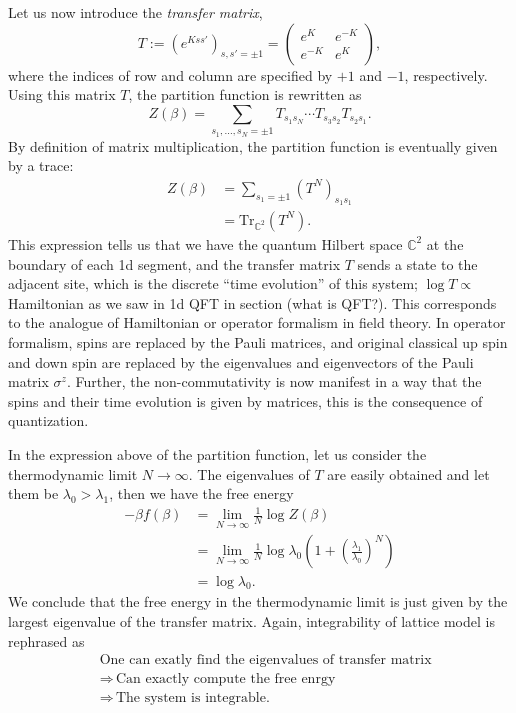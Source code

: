  Let us now introduce the \emph{transfer matrix},
\begin{equation}
  T  :=  \left(e^{Kss'}\right)_{s,s'=\pm1}
    =
    \left(\begin{array}{ll}
  e^{K}  &  e^{-K}  \\
  e^{-K}  &  e^{K}
\end{array}\right),
\end{equation}
 where the indices of row and column are specified by $+1$ and $-1$,
respectively. Using this matrix $T$, the partition function is rewritten
as
\begin{equation}
  Z\left(\beta\right)
    =\sum_{s_{1},\ldots,s_{N}=\pm1}  T_{s_{1}s_{N}}  \cdots  T_{s_{3}s_{2}}T_{s_{2}s_{1}}.
\end{equation}
 By definition of matrix multiplication, the partition function is
eventually given by a trace:
\begin{align}
  Z\left(\beta\right)
  & =  \sum_{s_{1}=\pm1}\left(T^{N}\right)_{s_{1}s_{1}}  \nonumber \\
  & =  \mathrm{Tr}_{\mathbb{C}^{2}}\left(T^{N}\right).
\end{align}
 This expression tells us that we have the quantum Hilbert space $\mathbb{C}^{2}$
at the boundary of each 1d segment, and the transfer matrix $T$ sends
a state to the adjacent site, which is the discrete ``time evolution''
of this system; $\log T\propto$ Hamiltonian as we saw in 1d QFT in
section (what is QFT?). This corresponds to the analogue of Hamiltonian
or operator formalism in field theory. In operator formalism, spins
are replaced by the Pauli matrices, and original classical up spin
and down spin are replaced by the eigenvalues and eigenvectors of
the Pauli matrix $\sigma^{z}$. Further, the non-commutativity is
now manifest in a way that the spins and their time evolution is given
by matrices, this is the consequence of quantization.

In the expression above of the partition function, let us consider
the thermodynamic limit $N\rightarrow\infty$. The eigenvalues of
$T$ are easily obtained and let them be $\lambda_{0}>\lambda_{1}$,
then we have the free energy
\begin{align}
-\beta f\left(\beta\right)
  & =  \lim_{N\rightarrow\infty}\frac{1}{N}\log Z\left(\beta\right)\nonumber \\
  & =  \lim_{N\rightarrow\infty}\frac{1}{N}\log\lambda_{0}\left(1+\left(\frac{\lambda_{1}}{\lambda_{0}}\right)^{N}\right)\nonumber \\
  & =  \log\lambda_{0}.
\end{align}
 We conclude that the free energy in the thermodynamic limit is just
given by the largest eigenvalue of the transfer matrix. Again, integrability
of lattice model is rephrased as
\begin{align*}
 &  \textrm{One can exatly find the eigenvalues of transfer matrix}\\
 &  \Rightarrow  \,  \textrm{Can exactly compute the free enrgy}\\
 &  \Rightarrow  \,  \textrm{The system is integrable. }
\end{align*}

